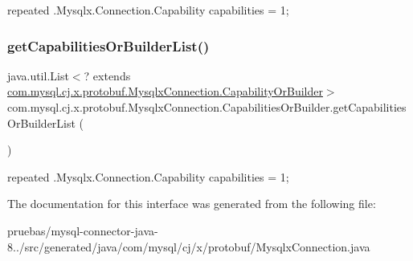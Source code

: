 {\ttfamily repeated .Mysqlx.\+Connection.\+Capability capabilities = 1;} \mbox{\label{interfacecom_1_1mysql_1_1cj_1_1x_1_1protobuf_1_1_mysqlx_connection_1_1_capabilities_or_builder_a86be66e7a1557c55d7fc3ccd6e6c1639}} 
\subsubsection{\texorpdfstring{get\+Capabilities\+Or\+Builder\+List()}{getCapabilitiesOrBuilderList()}}
{\footnotesize\ttfamily java.\+util.\+List$<$? extends \mbox{\hyperlink{interfacecom_1_1mysql_1_1cj_1_1x_1_1protobuf_1_1_mysqlx_connection_1_1_capability_or_builder}{com.\+mysql.\+cj.\+x.\+protobuf.\+Mysqlx\+Connection.\+Capability\+Or\+Builder}}$>$ com.\+mysql.\+cj.\+x.\+protobuf.\+Mysqlx\+Connection.\+Capabilities\+Or\+Builder.\+get\+Capabilities\+Or\+Builder\+List (\begin{DoxyParamCaption}{ }\end{DoxyParamCaption})}

{\ttfamily repeated .Mysqlx.\+Connection.\+Capability capabilities = 1;} 

The documentation for this interface was generated from the following file\+:\begin{DoxyCompactItemize}
\item 
pruebas/mysql-\/connector-\/java-\/8../src/generated/java/com/mysql/cj/x/protobuf/Mysqlx\+Connection.\+java\end{DoxyCompactItemize}
